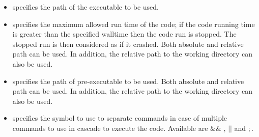 \subnodesIntro
%
\begin{itemize}
  \item {}  specifies the path
  of the executable to be used.

  \item {}   specifies the maximum
  allowed run time of the code; if the code running time is greater than the specified
  walltime then the code run is stopped. The stopped run is then considered as if it crashed.
  \nb Both absolute and relative path can be used. In addition, the relative path
  to the working directory can also be used.
  \item {}  specifies the path of
    pre-executable to be used.
  \nb Both absolute and relative path can be used. In addition, the relative path
  to the working directory can also be used.
  \item {}  specifies the symbol to use to separate commands
  in case of multiple commands to use in cascade to execute the code. Available are $\&\&$ ,  $\left |  \right |$ and $;$.


\end{itemize}
